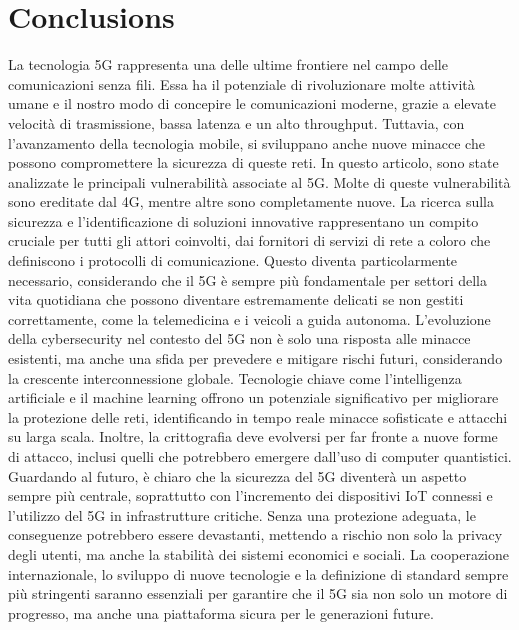 \documentclass[english]{article}
\begin{document}
\section{Conclusions}
La tecnologia 5G rappresenta una delle ultime frontiere nel campo delle
comunicazioni senza fili. Essa ha il potenziale di rivoluzionare molte attività
umane e il nostro modo di concepire le comunicazioni moderne, grazie a elevate
velocità di trasmissione, bassa latenza e un alto throughput. Tuttavia, con
l'avanzamento della tecnologia mobile, si sviluppano anche nuove minacce che
possono compromettere la sicurezza di queste reti. In questo articolo, sono
state analizzate le principali vulnerabilità associate al 5G. Molte di queste
vulnerabilità sono ereditate dal 4G, mentre altre sono completamente nuove. La
ricerca sulla sicurezza e l'identificazione di soluzioni innovative
rappresentano un compito cruciale per tutti gli attori coinvolti, dai fornitori
di servizi di rete a coloro che definiscono i protocolli di comunicazione.
Questo diventa particolarmente necessario, considerando che il 5G è sempre più
fondamentale per settori della vita quotidiana che possono diventare
estremamente delicati se non gestiti correttamente, come la telemedicina e i
veicoli a guida autonoma. L’evoluzione della cybersecurity nel contesto del 5G
non è solo una risposta alle minacce esistenti, ma anche una sfida per
prevedere e mitigare rischi futuri, considerando la crescente interconnessione
globale. Tecnologie chiave come l'intelligenza artificiale e il machine
learning offrono un potenziale significativo per migliorare la protezione delle
reti, identificando in tempo reale minacce sofisticate e attacchi su larga
scala. Inoltre, la crittografia deve evolversi per far fronte a nuove forme di
attacco, inclusi quelli che potrebbero emergere dall’uso di computer
quantistici. Guardando al futuro, è chiaro che la sicurezza del 5G diventerà un
aspetto sempre più centrale, soprattutto con l'incremento dei dispositivi IoT
connessi e l’utilizzo del 5G in infrastrutture critiche. Senza una protezione
adeguata, le conseguenze potrebbero essere devastanti, mettendo a rischio non
solo la privacy degli utenti, ma anche la stabilità dei sistemi economici e
sociali. La cooperazione internazionale, lo sviluppo di nuove tecnologie e la
definizione di standard sempre più stringenti saranno essenziali per garantire
che il 5G sia non solo un motore di progresso, ma anche una piattaforma sicura
per le generazioni future. \clearpage \appendix
\end{document}
